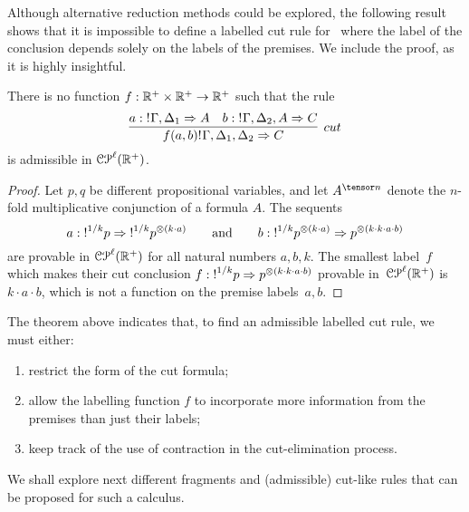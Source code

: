Although alternative reduction methods could be explored, the following result shows that it is impossible to define a labelled cut rule for \laSELLR\ where the label of the conclusion depends solely on the labels of the premises. We include the  proof, as it is highly insightful.
\begin{theorem}\label{thm:impossible} There is no function $f:\mathbb{R}^+\times \mathbb{R}^+\rightarrow\mathbb{R}^+$ such that the rule
$$
\infer[cut]{f(a,b)\nbang{}\Gamma,\Delta_1,\Delta_2\seq C}
	{a: \nbang{}\Gamma,\Delta_1\seq A &
	b:\nbang{}\Gamma,\Delta_2,A\seq C
	}
$$
is admissible in $\mathcal{CP}^\ell(\mathbb{R}^{+})$.
\end{theorem}
\begin{proof}
Let $p,q$ be different propositional variables, and let $A^{\tensor n}$ denote the $n$-fold multiplicative conjunction of a formula $A$. The sequents
$$a:\hbox{$\mathop{!}^{1/k}$}p\Rightarrow\hbox{$\mathop{!}^{1/k}$}p^{\otimes (k\cdot a)}\qquad\text{and}\qquad b:\hbox{$\mathop{!}^{1/k}$}p^{\otimes (k\cdot a)}\Rightarrow p^{\otimes(k\cdot k\cdot a\cdot b)} 
$$
are provable in $\mathcal{CP}^\ell(\mathbb{R}^{+})$ for all natural numbers $a,b,k$. The smallest label~$f$ which makes their cut conclusion
$f: \hbox{$\mathop{!}^{1/k}$}p\Rightarrow p^{\otimes(k\cdot k\cdot a\cdot b)}
$ 
provable in~$\mathcal{CP}^\ell(\mathbb{R}^{+})$ is~$k\cdot a\cdot b$, which is not a function on the premise labels~$a,b$.
\end{proof}

\noindent

The theorem above indicates that, to find an admissible labelled cut rule, we must either:
\begin{enumerate}
\item restrict the form of the cut formula;
\item allow the labelling function $f$ to incorporate more information from the premises than just their labels;
\item keep track of the use of contraction in the cut-elimination process.
\end{enumerate}

We shall explore next
different fragments and (admissible) cut-like rules that can be proposed for such a calculus. 
